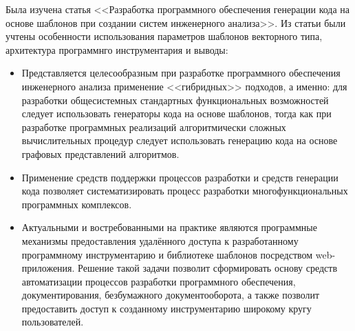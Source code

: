 \def\notedate{2022.10.02}
\def\currentauthor{Василян А.Р. (РК6-73Б)}

	
Была изучена статья <<Разработка программного обеспечения генерации кода на основе шаблонов при создании систем инженерного анализа>>. Из статьи были учтены особенности использования параметров шаблонов векторного типа, архитектура программнго инструментария и выводы:
\begin{itemize}
	\item Представляется целесообразным при разработке программного обеспечения инженерного анализа применение <<гибридных>> подходов, а именно: для разработки общесистемных стандартных функциональных возможностей следует использовать генераторы кода на основе шаблонов, тогда как при разработке программных реализаций алгоритмически сложных вычислительных процедур следует использовать генерацию кода на основе графовых представлений алгоритмов.
	\item Применение средств поддержки процессов разработки и средств генерации кода позволяет систематизировать процесс разработки многофункциональных программных комплексов.
	\item Актуальными и востребованными на практике являются программные механизмы предоставления удалённого доступа к разработанному программному инструментарию и библиотеке шаблонов посредством web-приложения. Решение такой задачи позволит сформировать основу средств автоматизации процессов разработки программного обеспечения, документирования, безбумажного документооборота, а также позволит предоставить доступ к созданному инструментарию широкому кругу пользователей.
\end{itemize}

\noteattributes{}

